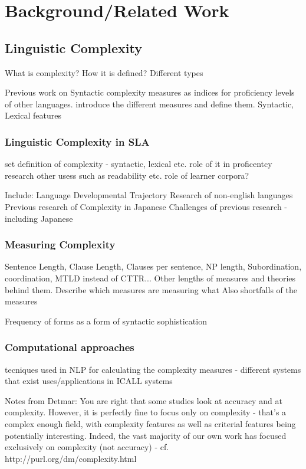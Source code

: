 \chapter{Background/Related Work}

\section{Linguistic Complexity}
What is complexity? How it is defined? Different types

Previous work on Syntactic complexity measures as indices for proficiency levels of other languages.
introduce the different measures and define them.
Syntactic, Lexical features

\subsection{Linguistic Complexity in SLA}
set definition of complexity - syntactic, lexical etc.
role of it in proficentcy research
other usess such as readability etc.
role of learner corpora?

Include:
Language Developmental Trajectory
Research of non-english languages
Previous research of Complexity in Japanese
Challenges of previous research - including Japanese


\subsection{Measuring Complexity}
Sentence Length, Clause Length, Clauses per sentence, NP length, Subordination, coordination, MTLD instead of CTTR...
Other lengths of measures and theories behind them. Describe which measures are measuring what Also shortfalls of the
measures


Frequency of forms as a form of syntactic sophistication \cite{Ellis2004}
%

\subsection{Computational approaches}
tecniques used in NLP for calculating the complexity measures - different systems that exist
uses/applications in ICALL systems




Notes from Detmar:
You are right that some studies look at accuracy and at
complexity. However, it is perfectly fine to focus only on complexity
- that's a complex enough field, with complexity features as well as
criterial features being potentially interesting. Indeed, the vast
majority of our own work has focused exclusively on complexity (not
accuracy) - cf. http://purl.org/dm/complexity.html

